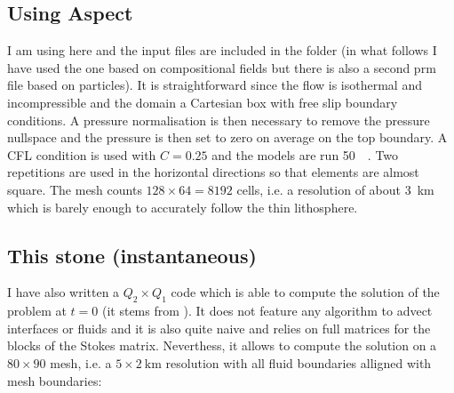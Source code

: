 \subsection*{Using Aspect}

I am using here \aspect and the input files are included in the folder (in 
what follows I have used the one based on compositional fields but there
is also a second prm file based on particles). It is straightforward 
since the flow is isothermal and incompressible and the domain a Cartesian box with 
free slip boundary conditions. A pressure normalisation is then necessary to remove 
the pressure nullspace and the pressure is then set to zero on average on the top boundary. 
A CFL condition is used with $C=0.25$ and the models 
are run 50~\si{\mega\year}. 
Two repetitions are used in the horizontal directions so that elements are almost square.
The mesh counts $128\times 64=8192$ cells, i.e. a resolution of about 3~\si{\km} which is barely enough to 
accurately follow the thin lithosphere.


\subsection*{This stone (instantaneous)}

I have also written a $Q_2\times Q_1$ code which is able to 
compute the solution of the problem at $t=0$ (it stems from ). 
It does not feature any algorithm to advect interfaces or fluids and
it is also quite naive and relies on full matrices for the 
blocks of the Stokes matrix. Neverthess, it allows to compute the solution 
on a $80\times 90$ mesh, i.e. a $5\times 2~\si{\km}$ resolution with 
all fluid boundaries alligned with mesh boundaries:

